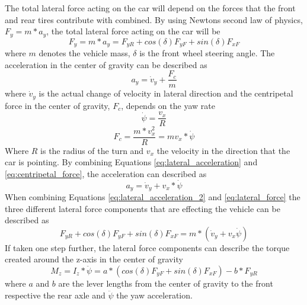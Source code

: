 The total lateral force acting on the car will depend on the forces that the front and rear tires contribute with combined. By using Newtons second law of physics, $ F_{y} = m*a_{y} $, the total lateral force acting on the car will be
\begin{equation} \label{eq:lateral_force}
	F_{y} = m*a_{y} = F_{yR} + cos(\delta)F_{yF} + sin(\delta)F_{xF} 
\end{equation}
where $ m $ denotes the vehicle mass, $ \delta $ is the front wheel steering angle. The acceleration in the center of gravity can be described as 
\begin{equation} \label{eq:lateral_acceleration}
	a_{y} = \dot v_{y} + \dfrac{F_{c}}{m}
\end{equation}
where $ \dot v_{y} $ is the actual change of velocity in lateral direction and the centripetal force in the center of gravity, $ F_{c} $, depends on the yaw rate
\begin{equation} \label{eq:yaw_rate}
	\dot \psi = \dfrac{v_{x}}{R}
\end{equation}
\begin{equation} \label{eq:centripetal_force}
	F_{c} = \dfrac{m*v^2_{x}}{R} = mv_{x}*\dot \psi
\end{equation}
Where $ R $ is the radius of the turn and $ v_{x} $ the velocity in the direction that the car is pointing. By combining Equations \ref{eq:lateral_acceleration} and \ref{eq:centripetal_force}, the acceleration can described as
\begin{equation} \label{eq:lateral_acceleration_2}
	a_{y} = \dot v_{y} + v_{x}*\dot \psi
\end{equation}
When combining Equations \ref{eq:lateral_acceleration_2} and \ref{eq:lateral_force} the three different lateral force components that are effecting the vehicle can be described as
\begin{equation} \label{lateral_forces_2}
	F_{yR} + cos(\delta)F_{yF} + sin(\delta)F_{xF} = m*(\dot v_{y} + v_{x}\dot \psi)
\end{equation}
If taken one step further, the lateral force components can describe the torque created around the z-axis in the center of gravity 
\begin{equation} \label{yaw_bicycle}
	M_{z} = I_{z}* \ddot \psi = a*(cos(\delta)F_{yF} + sin(\delta)F_{xF}) - b*F_{yR}
\end{equation}
where $ a $ and $ b $ are the lever lengths from the center of gravity to the front respective the rear axle and $ \ddot \psi $ the yaw acceleration. 

